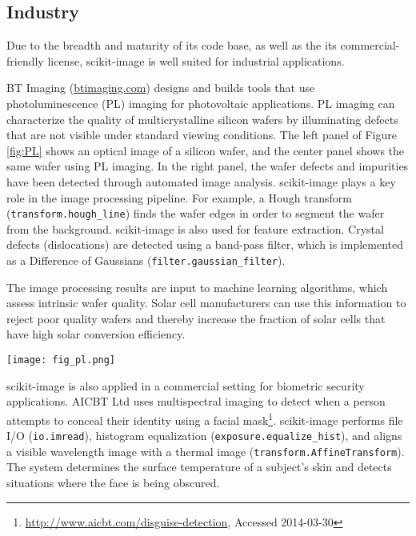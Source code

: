 
  \subsection*{Industry}
    \label{industry}

    Due to the breadth and maturity of its code base, as well as the its commercial-friendly license, scikit-image is well suited for industrial applications.

    BT Imaging (\url{btimaging.com}) designs and builds tools that use photoluminescence (PL) imaging for photovoltaic applications. PL imaging can characterize the quality of multicrystalline silicon wafers by illuminating defects that are not visible under standard viewing conditions. The left panel of Figure \ref{fig:PL} shows an optical image of a silicon wafer, and the center panel shows the same wafer using PL imaging. In the right panel, the wafer defects and impurities have been detected through automated image analysis. scikit-image plays a key role in the image processing pipeline. For example, a Hough transform (\texttt{transform.hough\_line}) finds the wafer edges in order to segment the wafer from the background. scikit-image is also used for feature extraction. Crystal defects (dislocations) are detected using a band-pass filter, which is implemented as a Difference of Gaussians (\texttt{filter.gaussian\_filter}).

    The image processing results are input to machine learning algorithms, which assess intrinsic wafer quality. Solar cell manufacturers can use this information to reject poor quality wafers and thereby increase the fraction of solar cells that have high solar conversion efficiency.

    \begin{figure*}[bht]

      \texttt{[image: fig\_pl.png]}

      \caption{(a): An image of an as-cut silicon wafer before it has been processed into a solar cell. (b): A PL image of the same wafer. Wafer defects, which have a negative impact solar cell efficiency, are visible as dark regions. (c): Image processing results. Defects in the crystal growth (dislocations) are colored blue, while red indicates the presence of impurities. \label{fig:PL}}
    \end{figure*}

    scikit-image is also applied in a commercial setting for biometric security applications. AICBT Ltd uses multispectral imaging to detect when a person attempts to conceal their identity using a facial mask\footnote{\url{http://www.aicbt.com/disguise-detection}, Accessed 2014-03-30}. scikit-image performs file I/O (\texttt{io.imread}), histogram equalization (\texttt{exposure.equalize\_hist}), and aligns a visible wavelength image with a thermal image (\texttt{transform.AffineTransform}). The system determines the surface temperature of a subject's skin and detects situations where the face is being obscured.
